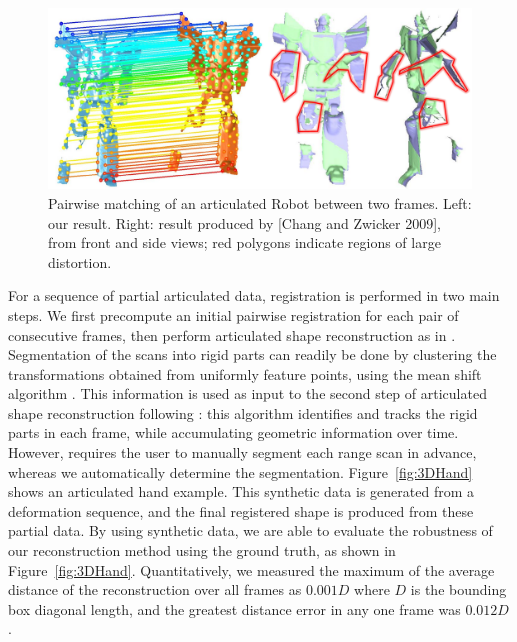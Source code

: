 \begin{figure}[t!]
\centering
  \includegraphics[width=0.95\linewidth]{figures/Robot.pdf}
  \caption{Pairwise matching of an articulated Robot between two frames.
           Left: our result. Right: result produced by [Chang and Zwicker 2009], from front and side views; red polygons indicate regions of large distortion.}
\label{fig:3DRobot}
\end{figure}

For a sequence of partial articulated data, registration is performed in two main steps.
We first precompute an initial pairwise registration for each pair of consecutive frames, then perform articulated shape reconstruction as in \cite{Pekelny08}.
Segmentation of the scans into rigid parts can readily be done by clustering the transformations obtained from uniformly feature points,
using the mean shift algorithm \cite{Comaniciu02}.
This information is used as input to the second step of articulated shape reconstruction following \cite{Pekelny08}:
this algorithm identifies and tracks the rigid parts in each frame, while accumulating  geometric information over time.
However, \cite{Pekelny08} requires the user to manually segment each range scan in advance, whereas we automatically determine  the segmentation.
Figure~\ref{fig:3DHand} shows an articulated hand example.
This synthetic data is generated from a deformation sequence, and the final registered shape is produced from these partial data.
By using synthetic data, we are able to evaluate the robustness of our reconstruction method using the ground truth, as shown in Figure~\ref{fig:3DHand}.
Quantitatively, we measured the maximum of the average distance of the reconstruction over all frames as $0.001 D$ where $D$ is the bounding box diagonal length, and
the greatest distance error in any one frame was $0.012 D$.

